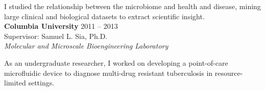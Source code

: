 \documentclass[10pt]{article}
\newenvironment{innerlist}[1][\enskip\textbullet]%
        {\begin{itemize}[#1,leftmargin=*,parsep=0pt,itemsep=0pt,topsep=0pt,partopsep=0pt]}
        {\end{itemize}}
\begin{document}
I studied the relationship between the microbiome and health and disease, mining large clinical and biological datasets to extract scientific insight. \\



\textbf{Columbia University} \hfill {2011 -- 2013} \\
Supervisor: Samuel L. Sia, Ph.D. \\
\textit{Molecular and Microscale Bioengineering Laboratory}
	\vspace{0.08in}

As an undergraduate researcher, I worked on developing a point-of-care microfluidic device to diagnose multi-drug resistant tuberculosis in resource-limited settings. 



%
\end{document}
